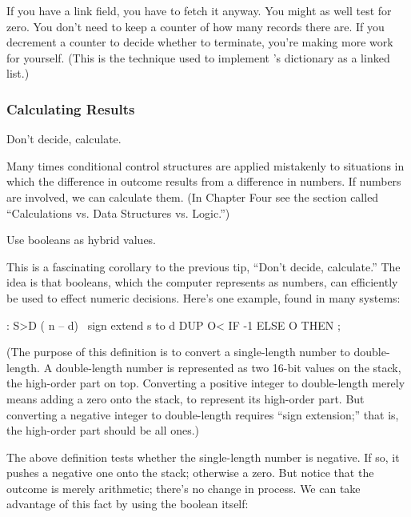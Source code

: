 If you have a link field, you have to fetch it anyway. You might as
well test for zero. You don't need to keep a counter of how many records
there are. If you decrement a counter to decide whether to terminate,
you're making more work for yourself. (This is the technique used to
implement \Forth{}'s dictionary as a linked list.)%
%
%
%
%

\subsubsection{Calculating Results}%
%
%

\begin{tip}
Don't decide, calculate.
\end{tip}
Many times conditional control structures are applied mistakenly to
situations in which the difference in outcome results from a difference in
numbers. If numbers are involved, we can calculate them. (In Chapter
Four see the section called ``Calculations vs. Data Structures vs. Logic.'')
%
\begin{tip}
Use booleans as hybrid values.
\end{tip}
This is a fascinating corollary to the previous tip, ``Don't decide,
calculate.'' The idea is that booleans, which the computer represents as
numbers, can efficiently be used to effect numeric decisions. Here's one
example, found in many \Forth{} systems:

\begin{Code}
: S>D  ( n -- d)  \ sign extend s to d
     DUP O<  IF -1  ELSE  O THEN ;
\end{Code}
(The purpose of this definition is to convert a single-length number to
double-length. A double-length number is represented as two 16-bit
values on the stack, the high-order part on top. Converting a positive
integer to double-length merely means adding a zero onto the stack, to
represent its high-order part. But converting a negative integer to
double-length requires ``sign extension;'' that is, the high-order part
should be all ones.)

The above definition tests whether the single-length number is negative.
If so, it pushes a negative one onto the stack; otherwise a zero.  But
notice that the outcome is merely arithmetic; there's no change in
process. We can take advantage of this fact by using the boolean itself:

